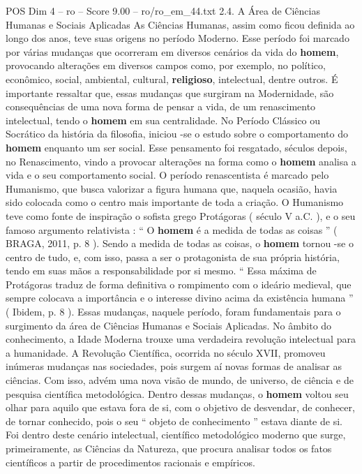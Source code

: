 \begin{textsample}{POS Dim 4 – ro – Score 9.00 – ro/ro\_em\_44.txt}  \label{ex:f4_pos_219}
2.4.
A Área de Ciências Humanas e Sociais Aplicadas As Ciências Humanas, assim como ficou definida ao longo dos anos, teve suas origens no período Moderno.
Esse período foi marcado por várias mudanças que ocorreram em diversos cenários da vida do \textbf{homem}, provocando alterações em diversos campos como, por exemplo, no político, econômico, social, ambiental, cultural, \textbf{religioso}, intelectual, dentre outros.
É importante ressaltar que, essas mudanças que surgiram na Modernidade, são consequências de uma nova forma de pensar a vida, de um renascimento intelectual, tendo o \textbf{homem} em sua centralidade.
No Período Clássico ou Socrático da história da filosofia, iniciou -se o estudo sobre o comportamento do \textbf{homem} enquanto um ser social.
Esse pensamento foi resgatado, séculos depois, no Renascimento, vindo a provocar alterações na forma como o \textbf{homem} analisa a vida e o seu comportamento social.
O período renascentista é marcado pelo Humanismo, que busca valorizar a figura humana que, naquela ocasião, havia sido colocada como o centro mais importante de toda a criação.
O Humanismo teve como fonte de inspiração o sofista grego Protágoras ( século V a.C. ), e o seu famoso argumento relativista : “ O \textbf{homem} é a medida de todas as coisas ” ( BRAGA, 2011, p. 8 ).
Sendo a medida de todas as coisas, o \textbf{homem} tornou -se o centro de tudo, e, com isso, passa a ser o protagonista de sua própria história, tendo em suas mãos a responsabilidade por si mesmo. “ Essa máxima de Protágoras traduz de forma definitiva o rompimento com o ideário medieval, que sempre colocava a importância e o interesse divino acima da existência humana ” ( Ibidem, p. 8 ).
Essas mudanças, naquele período, foram fundamentais para o surgimento da área de Ciências Humanas e Sociais Aplicadas.
No âmbito do conhecimento, a Idade Moderna trouxe uma verdadeira revolução intelectual para a humanidade.
A Revolução Científica, ocorrida no século XVII, promoveu inúmeras mudanças nas sociedades, pois surgem aí novas formas de analisar as ciências.
Com isso, advém uma nova visão de mundo, de universo, de ciência e de pesquisa científica metodológica.
Dentro dessas mudanças, o \textbf{homem} voltou seu olhar para aquilo que estava fora de si, com o objetivo de desvendar, de conhecer, de tornar conhecido, pois o seu “ objeto de conhecimento ” estava diante de si.
Foi dentro deste cenário intelectual, científico metodológico moderno que surge, primeiramente, as Ciências da Natureza, que procura analisar todos os fatos científicos a partir de procedimentos racionais e empíricos.

\end{textsample}
